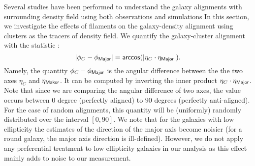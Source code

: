 \documentclass[usenatbib,useAMS]{mnras}
\theoremstyle{remark}
\newcommand{\sukhdeep}[1]{{\textcolor{magenta}{SS: #1}}}
\newcommand{\rachel}[1]{{\textcolor{cyan}{RM: #1}}}
\begin{document}
Several studies have been performed to understand the galaxy alignments with surrounding density field using both observations and simulations 
\citep[see eg. ][ for review]{2015SSRv..193..139K}
In this section, we investigate the effects of filaments on the galaxy-density alignment using clusters as the tracers of density field. We quantify the galaxy-cluster alignment with the statistic \citep{2009ApJ...706..747Z,2013MNRAS.428.1827T, 2015MNRAS.450.2727T,2015MNRAS.454.3341C}:
{
\begin{equation}\label{eq:cl-alignment-stat}
|\phi_C-\phi_{\sf Major}| ={\sf arccos}(|\eta_C\cdot \eta_{\sf Major}|).
\end{equation}
Namely, the quantity $\phi_C-\phi_{\sf Major}$ is the angular difference between the the two
axes $\eta_C$ and $\eta_{\sf Makor}$.
It can be computed by inverting
the inner product $\eta_C\cdot \eta_{\sf Major}$.  
Note that since we are comparing the angular difference of two axes,
the value occurs between $0$ degree (perfectly aligned) to $90$ degrees (perfectly anti-aligned). 
For the case of random alignments, this quantity will be (uniformly) randomly distributed 
over the interval $[0,90]$.
}
We note that for the galaxies with low ellipticity the estimates of the direction of the major axis 
become noisier (for a round galaxy, the major axis direction is ill-defined). However, we do not apply any 
preferential treatment to low ellipticity galaxies in our analysis as this effect mainly adds to noise to 
our measurement.
\end{document}
